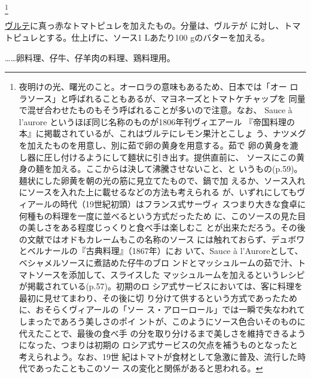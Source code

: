 \begin{recette}
\footnote{夜明けの光、曙光のこと。オーロラの意味もあるため、日本では「オー
  ロラソース」と呼ばれることもあるが、マヨネーズとトマトケチャップを
  同量で混ぜ合わせたものもそう呼ばれることが多いので注意。なお、 Sauce à
  l'aurore というほぼ同じ名称のものが1806年刊ヴィエアール
  『帝国料理の本』に掲載されているが、これはヴルテにレモン果汁とこしょ
  う、ナツメグを加えたものを用意し、別に茹で卵の黄身を用意する。茹で
  卵の黄身を漉し器に圧し付けるようにして麺状に引き出す。提供直前に、
  ソースにこの黄身の麺を加える。ここからは決して沸騰させないこと、と
  いうもの(p.59)。麺状にした卵黄を朝の光の筋に見立てたもので、鍋で加
  えるか、ソース入れにソースを入れた上に載せるなどの方法も考えられる
  が、いずれにしてもヴィアールの時代（19世紀初頭）はフランス式サーヴィ
  スつまり大きな食卓に何種もの料理を一度に並べるという方式だったため
  に、このソースの見た目の美しさをある程度じっくりと食べ手は楽しむこ
  とが出来ただろう。その後の文献ではオドもカレームもこの名称のソース
  には触れておらず、デュボワとベルナールの『古典料理』（1867年）にお
  いて、Sauce à l'Auroreとして、ベシャメルソースに煮詰めた仔牛のブロ
  ンドとマッシュルームの茹で汁、トマトソースを添加して、スライスした
  マッシュルームを加えるというレシピが掲載されている(p.57)。初期のロ
  シア式サービスにおいては、客に料理を最初に見せてまわり、その後に切
  り分けて供するという方式であったために、おそらくヴィアールの「ソー
  ス・アローロール」では一瞬で失なわれてしまったであろう美しさのポイ
  ントが、このようにソース色合いそのものに代えたことで、最後の食べ手
  の分を取り分けるまで美しさを維持できるようになった、つまりは初期の
  ロシア式サービスの欠点を補うものとなったと考えられよう。なお、19世
  紀はトマトが食材として急激に普及、流行した時代であったこともこのソー
  スの変化と関係があると思われる。}


\protect\hyperlink{veloute}{ヴルテ}に真っ赤なトマトピュレを加えたもの。分量は、ヴルテが
\troisquarts{}に対し、トマトピュレ\unquart{}とする。仕上げに、ソース1
Lあたり100 gのバターを加える。

\ldots{}\ldots{}卵料理、仔牛、仔羊肉の料理、鶏料理用。

\maeaki


\end{recette}
